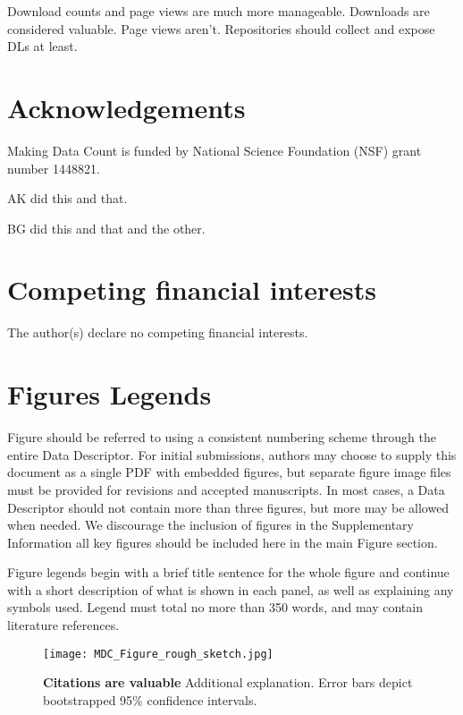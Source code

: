 \documentclass[english]{article}
\begin{document}
Download counts and page views are much more manageable.
Downloads are considered valuable.
Page views aren't.
Repositories should collect and expose DLs at least.



\section*{Acknowledgements}

Making Data Count is funded by National Science Foundation (NSF) grant number 1448821.

AK did this and that. 

BG did this and that and the other. 


\section*{Competing financial interests}


The author(s) declare no competing financial interests.


\section*{Figures Legends}

Figure should be referred to using a consistent numbering scheme through
the entire Data Descriptor. For initial submissions, authors may choose
to supply this document as a single PDF with embedded figures, but
separate figure image files must be provided for revisions and accepted
manuscripts. In most cases, a Data Descriptor should not contain more
than three figures, but more may be allowed when needed. We discourage
the inclusion of figures in the Supplementary Information \textendash{}
all key figures should be included here in the main Figure section. 

Figure legends begin with a brief title sentence for the whole figure
and continue with a short description of what is shown in each panel,
as well as explaining any symbols used. Legend must total no more
than 350 words, and may contain literature references. 

\begin{figure}[!ht]
\begin{center}
\texttt{[image: MDC\_Figure\_rough\_sketch.jpg]}
\end{center}
\caption{
{\bf Citations are valuable}
Additional explanation.
Error bars depict bootstrapped 95\% confidence intervals. 
}
\label{fig:results}
\end{figure}
\end{document}
